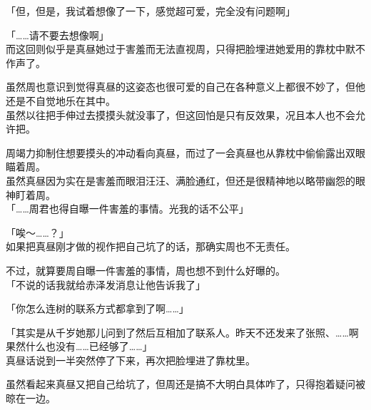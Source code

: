 「但，但是，我试着想像了一下，感觉超可爱，完全没有问题啊」

「……请不要去想像啊」\\

而这回则似乎是真昼她过于害羞而无法直视周，只得把脸埋进她爱用的靠枕中默不作声了。

虽然周也意识到觉得真昼的这姿态也很可爱的自己在各种意义上都很不妙了，但他还是不自觉地乐在其中。\\

虽然以往把手伸过去摸摸头就没事了，但这回怕是只有反效果，况且本人也不会允许把。

周竭力抑制住想要摸头的冲动看向真昼，而过了一会真昼也从靠枕中偷偷露出双眼瞄着周。\\

虽然真昼因为实在是害羞而眼泪汪汪、满脸通红，但还是很精神地以略带幽怨的眼神盯着周。\\

「……周君也得自曝一件害羞的事情。光我的话不公平」

「唉～……？」\\

如果把真昼刚才做的视作把自己坑了的话，那确实周也不无责任。

不过，就算要周自曝一件害羞的事情，周也想不到什么好曝的。\\

「不说的话我就给赤泽发消息让他告诉我了」

「你怎么连树的联系方式都拿到了啊……」

「其实是从千岁她那儿问到了然后互相加了联系人。昨天不还发来了张照、……啊果然什么也没有……已经够了……」\\

真昼话说到一半突然停了下来，再次把脸埋进了靠枕里。

虽然看起来真昼又把自己给坑了，但周还是搞不大明白具体咋了，只得抱着疑问被晾在一边。
